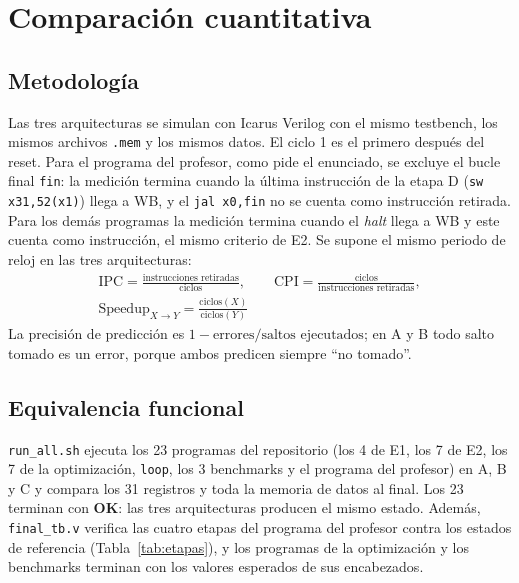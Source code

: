 \documentclass[12pt,a4paper]{article}
\begin{document}
\FloatBarrier
\section{Comparación cuantitativa}
\label{sec:comp}

\subsection{Metodología}

Las tres arquitecturas se simulan con Icarus Verilog con el mismo testbench, los mismos archivos \texttt{.mem} y los mismos datos. El ciclo 1 es el primero después del reset. Para el programa del profesor, como pide el enunciado, se excluye el bucle final \texttt{fin}: la medición termina cuando la última instrucción de la etapa D (\texttt{sw x31,52(x1)}) llega a WB, y el \texttt{jal x0,fin} no se cuenta como instrucción retirada. Para los demás programas la medición termina cuando el \textit{halt} llega a WB y este cuenta como instrucción, el mismo criterio de E2. Se supone el mismo periodo de reloj en las tres arquitecturas:
\begin{gather*}
\text{IPC} = \frac{\text{instrucciones retiradas}}{\text{ciclos}}, \qquad
\text{CPI} = \frac{\text{ciclos}}{\text{instrucciones retiradas}}, \\
\text{Speedup}_{X\to Y} = \frac{\text{ciclos}(X)}{\text{ciclos}(Y)}
\end{gather*}
La precisión de predicción es $1 - \text{errores}/\text{saltos ejecutados}$; en A y B todo salto tomado es un error, porque ambos predicen siempre ``no tomado''.

\subsection{Equivalencia funcional}

\texttt{run\_all.sh} ejecuta los 23 programas del repositorio (los 4 de E1, los 7 de E2, los 7 de la optimización, \texttt{loop}, los 3 benchmarks y el programa del profesor) en A, B y C y compara los 31 registros y toda la memoria de datos al final. Los 23 terminan con \textbf{OK}: las tres arquitecturas producen el mismo estado. Además, \texttt{final\_tb.v} verifica las cuatro etapas del programa del profesor contra los estados de referencia (Tabla~\ref{tab:etapas}), y los programas de la optimización y los benchmarks terminan con los valores esperados de sus encabezados.
\end{document}
